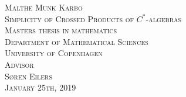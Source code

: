 \clearpage
\thispagestyle{empty}

\begin{titlingpage}
	\vspace*{5.5cm}
	\noindent
	{\large\textsc{Malthe Munk Karbo}}\\[0.5cm]
	{\large\textsc{Simplicity of Crossed Products of $C^*$-algebras}}\\[0.1cm]
	\vfill\noindent
	{\large\textsc{Masters thesis in mathematics}}\\[0.2cm]
	\noindent
	{\large\textsc{Department of Mathematical Sciences}}\\[0.2cm]
	\noindent
	{\large\textsc{University of Copenhagen}}\\[1cm]
	{\large\textsc{Advisor \\[0.2cm] {\Large Søren Eilers }}}\\[1cm]
	{\large\textsc{January 25th, 2019}}
	\let\cleardoublepage\clearpage
\end{titlingpage}
\normalfont
\restoregeometry
\cleardoublepage
